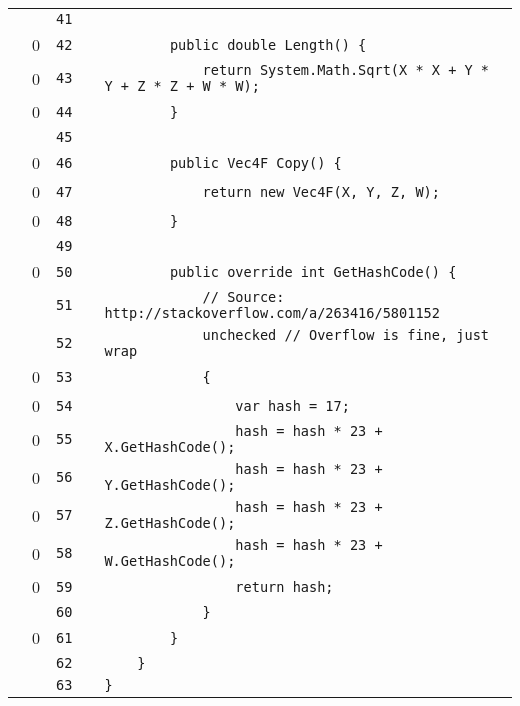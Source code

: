 \documentclass[a4paper,landscape,10pt]{article}
\begin{document}
\begin{longtable}[l]{lrrll}
\cellcolor{gray} &  & \verb~41~ & & \verb~~\\
\cellcolor{red} & 0 & \verb~42~ & & \verb~        public double Length() {~\\
\cellcolor{red} & 0 & \verb~43~ & & \verb~            return System.Math.Sqrt(X * X + Y * Y + Z * Z + W * W);~\\
\cellcolor{red} & 0 & \verb~44~ & & \verb~        }~\\
\cellcolor{gray} &  & \verb~45~ & & \verb~~\\
\cellcolor{red} & 0 & \verb~46~ & & \verb~        public Vec4F Copy() {~\\
\cellcolor{red} & 0 & \verb~47~ & & \verb~            return new Vec4F(X, Y, Z, W);~\\
\cellcolor{red} & 0 & \verb~48~ & & \verb~        }~\\
\cellcolor{gray} &  & \verb~49~ & & \verb~~\\
\cellcolor{red} & 0 & \verb~50~ & & \verb~        public override int GetHashCode() {~\\
\cellcolor{gray} &  & \verb~51~ & & \verb~            // Source: http://stackoverflow.com/a/263416/5801152~\\
\cellcolor{gray} &  & \verb~52~ & & \verb~            unchecked // Overflow is fine, just wrap~\\
\cellcolor{red} & 0 & \verb~53~ & & \verb~            {~\\
\cellcolor{red} & 0 & \verb~54~ & & \verb~                var hash = 17;~\\
\cellcolor{red} & 0 & \verb~55~ & & \verb~                hash = hash * 23 + X.GetHashCode();~\\
\cellcolor{red} & 0 & \verb~56~ & & \verb~                hash = hash * 23 + Y.GetHashCode();~\\
\cellcolor{red} & 0 & \verb~57~ & & \verb~                hash = hash * 23 + Z.GetHashCode();~\\
\cellcolor{red} & 0 & \verb~58~ & & \verb~                hash = hash * 23 + W.GetHashCode();~\\
\cellcolor{red} & 0 & \verb~59~ & & \verb~                return hash;~\\
\cellcolor{gray} &  & \verb~60~ & & \verb~            }~\\
\cellcolor{red} & 0 & \verb~61~ & & \verb~        }~\\
\cellcolor{gray} &  & \verb~62~ & & \verb~    }~\\
\cellcolor{gray} &  & \verb~63~ & & \verb~}~\\
\end{longtable}
\newpage
\end{document}
